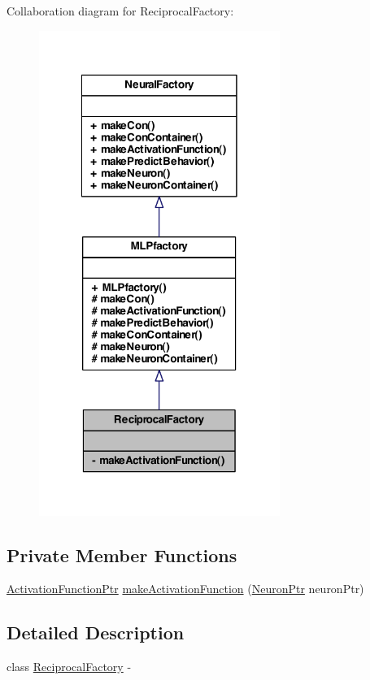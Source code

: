 Collaboration diagram for ReciprocalFactory:
\nopagebreak
\begin{figure}[H]
\begin{center}
\leavevmode
\includegraphics[width=222pt]{class_reciprocal_factory__coll__graph}
\end{center}
\end{figure}
\subsection*{Private Member Functions}
\begin{DoxyCompactItemize}
\item 
\hyperlink{_a_m_o_r_e_8h_a77602a0277a02e5769c3df0adc669b17}{ActivationFunctionPtr} \hyperlink{class_reciprocal_factory_a4258da65a19ff656c79bac5f2699b8d8}{makeActivationFunction} (\hyperlink{_a_m_o_r_e_8h_ac1ea936c2c7728eb382278131652fef4}{NeuronPtr} neuronPtr)
\end{DoxyCompactItemize}


\subsection{Detailed Description}
class \hyperlink{class_reciprocal_factory}{ReciprocalFactory} -\/ 

